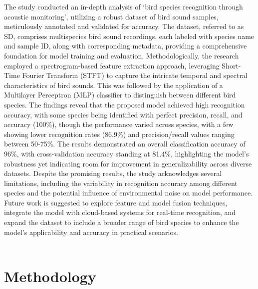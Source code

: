 The study conducted an in-depth analysis of `bird species recognition through acoustic monitoring', utilizing a robust dataset of bird sound samples, meticulously annotated and validated for accuracy. The dataset, referred to as SD, comprises multispecies bird sound recordings, each labeled with species name and sample ID, along with corresponding metadata, providing a comprehensive foundation for model training and evaluation. Methodologically, the research employed a spectrogram-based feature extraction approach, leveraging Short-Time Fourier Transform (STFT) to capture the intricate temporal and spectral characteristics of bird sounds. This was followed by the application of a Multilayer Perceptron (MLP) classifier to distinguish between different bird species. The findings reveal that the proposed model achieved high recognition accuracy, with some species being identified with perfect precision, recall, and accuracy (100\%), though the performance varied across species, with a few showing lower recognition rates (86.9\%) and precision/recall values ranging between 50-75\%. The results demonstrated an overall classification accuracy of 96\%, with cross-validation accuracy standing at 81.4\%, highlighting the model's robustness yet indicating room for improvement in generalizability across diverse datasets. Despite the promising results, the study acknowledges several limitations, including the variability in recognition accuracy among different species and the potential influence of environmental noise on model performance. Future work is suggested to explore feature and model fusion techniques, integrate the model with cloud-based systems for real-time recognition, and expand the dataset to include a broader range of bird species to enhance the model's applicability and accuracy in practical scenarios.\\
\\
\chapter{Methodology}
